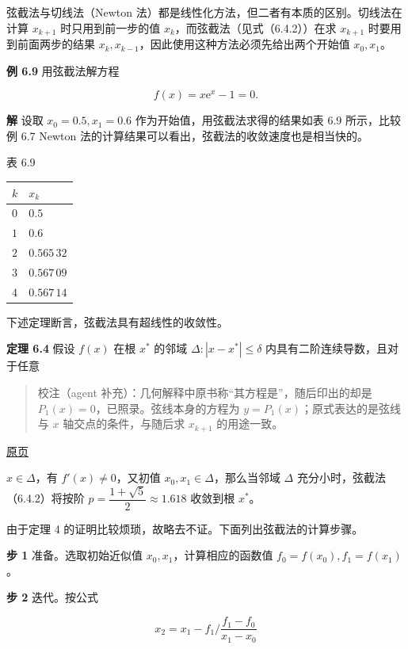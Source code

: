 \documentclass[
  10pt,
  fontset=fandol]{ctexart}
\newcounter{none} %
\begin{document}
弦截法与切线法（Newton 法）都是线性化方法，但二者有本质的区别。切线法在计算 \(x_{k+1}\) 时只用到前一步的值 \(x_k\)，而弦截法（见式（6.4.2））在求 \(x_{k+1}\) 时要用到前面两步的结果 \(x_k,x_{k-1}\)，因此使用这种方法必须先给出两个开始值 \(x_0,x_1\)。

\textbf{例 6.9} 用弦截法解方程

\[
f(x)=x\mathrm{e}^x-1=0.
\]

\textbf{解} 设取 \(x_0=0.5,x_1=0.6\) 作为开始值，用弦截法求得的结果如表 6.9 所示，比较例 6.7 Newton 法的计算结果可以看出，弦截法的收敛速度也是相当快的。

表 6.9

{\def\LTcaptype{none} %
\begin{longtable}[]{@{}ll@{}}
\toprule\noalign{}
\(k\) & \(x_k\) \\
\midrule\noalign{}
\endhead
\bottomrule\noalign{}
\endlastfoot
\(0\) & \(0.5\) \\
\(1\) & \(0.6\) \\
\(2\) & \(0.565\,32\) \\
\(3\) & \(0.567\,09\) \\
\(4\) & \(0.567\,14\) \\
\end{longtable}
}

下述定理断言，弦截法具有超线性的收敛性。

\textbf{定理 6.4} 假设 \(f(x)\) 在根 \(x^*\) 的邻域 \(\Delta:|x-x^*|\leqslant\delta\) 内具有二阶连续导数，且对于任意

\begin{quote}
校注（agent 补充）：几何解释中原书称``其方程是''，随后印出的却是 \(P_1(x)=0\)，已照录。弦线本身的方程为 \(y=P_1(x)\)；原式表达的是弦线与 \(x\) 轴交点的条件，与随后求 \(x_{k+1}\) 的用途一致。
\end{quote}

\href{../../source-images/pdf-169.jpeg}{原页}

\(x\in\Delta\)，有 \(f'(x)\ne0\)，又初值 \(x_0,x_1\in\Delta\)，那么当邻域 \(\Delta\) 充分小时，弦截法（6.4.2）将按阶 \(p=\dfrac{1+\sqrt{5}}{2}\approx1.618\) 收敛到根 \(x^*\)。

由于定理 4 的证明比较烦琐，故略去不证。下面列出弦截法的计算步骤。

\textbf{步 1} 准备。选取初始近似值 \(x_0,x_1\)，计算相应的函数值 \(f_0=f(x_0),f_1=f(x_1)\)。

\textbf{步 2} 迭代。按公式

\[
x_2=x_1-f_1\bigg/\frac{f_1-f_0}{x_1-x_0}
\]
\end{document}
